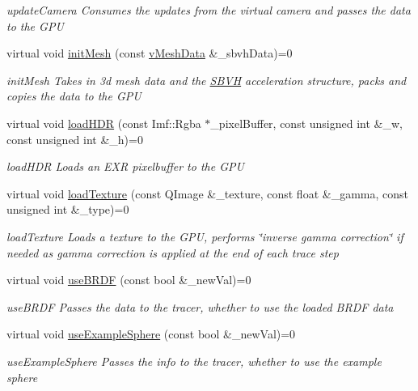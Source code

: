 \begin{DoxyCompactItemize}
\begin{DoxyCompactList}\small\item\em update\-Camera Consumes the updates from the virtual camera and passes the data to the G\-P\-U \end{DoxyCompactList}\item 
virtual void \hyperlink{classvRenderer_aa8e0dd2ed5b56dc3b10a3035d9678557}{init\-Mesh} (const \hyperlink{structvMeshData}{v\-Mesh\-Data} \&\-\_\-sbvh\-Data)=0
\begin{DoxyCompactList}\small\item\em init\-Mesh Takes in 3d mesh data and the \hyperlink{classSBVH}{S\-B\-V\-H} acceleration structure, packs and copies the data to the G\-P\-U \end{DoxyCompactList}\item 
virtual void \hyperlink{classvRenderer_aac0b1a8021d071e0816de34995488f6b}{load\-H\-D\-R} (const Imf\-::\-Rgba $\ast$\-\_\-pixel\-Buffer, const unsigned int \&\-\_\-w, const unsigned int \&\-\_\-h)=0
\begin{DoxyCompactList}\small\item\em load\-H\-D\-R Loads an E\-X\-R pixelbuffer to the G\-P\-U \end{DoxyCompactList}\item 
virtual void \hyperlink{classvRenderer_a904bc18544cfe877fc7e33d12d449c05}{load\-Texture} (const Q\-Image \&\-\_\-texture, const float \&\-\_\-gamma, const unsigned int \&\-\_\-type)=0
\begin{DoxyCompactList}\small\item\em load\-Texture Loads a texture to the G\-P\-U, performs \char`\"{}inverse gamma correction\char`\"{} if needed as gamma correction is applied at the end of each trace step \end{DoxyCompactList}\item 
virtual void \hyperlink{classvRenderer_af2d6b7f027ea76018a83b3c11177c9cf}{use\-B\-R\-D\-F} (const bool \&\-\_\-new\-Val)=0
\begin{DoxyCompactList}\small\item\em use\-B\-R\-D\-F Passes the data to the tracer, whether to use the loaded B\-R\-D\-F data \end{DoxyCompactList}\item 
virtual void \hyperlink{classvRenderer_ac4e01b762661e82813c8909d1c7a47c3}{use\-Example\-Sphere} (const bool \&\-\_\-new\-Val)=0
\begin{DoxyCompactList}\small\item\em use\-Example\-Sphere Passes the info to the tracer, whether to use the example sphere \end{DoxyCompactList}\item 

\end{DoxyCompactItemize}
